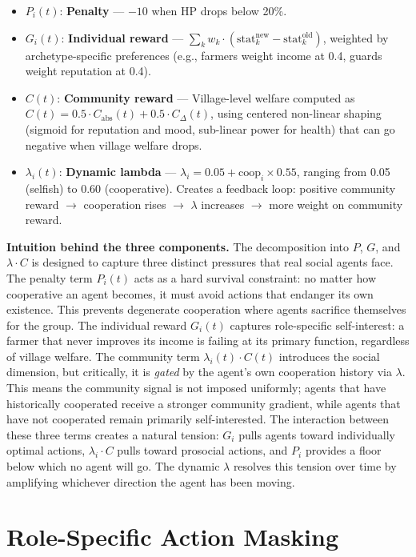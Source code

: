 \documentclass[12pt, a4paper, oneside]{report}
\begin{document}
\begin{itemize}[nosep]
    \item $P_i(t)$: \textbf{Penalty} --- $-10$ when HP drops below 20\%.
    \item $G_i(t)$: \textbf{Individual reward} --- $\sum_k w_k \cdot (\text{stat}_k^{\text{new}} - \text{stat}_k^{\text{old}})$, weighted by archetype-specific preferences (e.g., farmers weight income at 0.4, guards weight reputation at 0.4).
    \item $C(t)$: \textbf{Community reward} --- Village-level welfare computed as $C(t) = 0.5 \cdot C_{\text{abs}}(t) + 0.5 \cdot C_{\Delta}(t)$, using centered non-linear shaping (sigmoid for reputation and mood, sub-linear power for health) that can go negative when village welfare drops.
    \item $\lambda_i(t)$: \textbf{Dynamic lambda} --- $\lambda_i = 0.05 + \text{coop}_i \times 0.55$, ranging from 0.05 (selfish) to 0.60 (cooperative). Creates a feedback loop: positive community reward $\to$ cooperation rises $\to$ $\lambda$ increases $\to$ more weight on community reward.
\end{itemize}

\textbf{Intuition behind the three components.}
The decomposition into $P$, $G$, and $\lambda \cdot C$ is designed to capture three distinct pressures that real social agents face. The penalty term $P_i(t)$ acts as a hard survival constraint: no matter how cooperative an agent becomes, it must avoid actions that endanger its own existence. This prevents degenerate cooperation where agents sacrifice themselves for the group. The individual reward $G_i(t)$ captures role-specific self-interest: a farmer that never improves its income is failing at its primary function, regardless of village welfare. The community term $\lambda_i(t) \cdot C(t)$ introduces the social dimension, but critically, it is \emph{gated} by the agent's own cooperation history via $\lambda$. This means the community signal is not imposed uniformly; agents that have historically cooperated receive a stronger community gradient, while agents that have not cooperated remain primarily self-interested. The interaction between these three terms creates a natural tension: $G_i$ pulls agents toward individually optimal actions, $\lambda_i \cdot C$ pulls toward prosocial actions, and $P_i$ provides a floor below which no agent will go. The dynamic $\lambda$ resolves this tension over time by amplifying whichever direction the agent has been moving.

\section{Role-Specific Action Masking}
\label{sec:action-masking}
\end{document}
